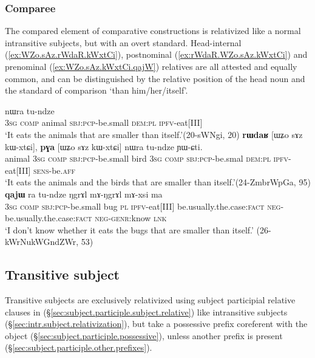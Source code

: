 \subsubsection{Comparee} \label{comparee.relativization}
The compared element of comparative constructions is relativized like a normal intransitive subjects, but with an overt standard. Head-internal (\ref{ex:WZo.sAz.rWdaR.kWxtCi}), postnominal (\ref{ex:rWdaR.WZo.sAz.kWxtCi}) and prenominal (\ref{ex:WZo.sAz.kWxtCi.qajW}) relatives are all attested and equally common, and can be distinguished by the relative position of the head noun and the standard of comparison  `than him/her/itself'.

\begin{exe}
\ex 
\begin{xlist}
\ex \label{ex:WZo.sAz.rWdaR.kWxtCi}
 nɯra tu-ndze \\
\textsc{3sg} \textsc{comp} animal \textsc{sbj}:\textsc{pcp}-be.small \textsc{dem}:\textsc{pl} \textsc{ipfv}-eat[III] \\
\glt `It eats the animals that are smaller than itself.'(20-sWNgi, 20)
\ex \label{ex:rWdaR.WZo.sAz.kWxtCi}
\gll \textbf{rɯdaʁ} [ɯʑo sɤz kɯ-xtɕi], \textbf{pɣa} [ɯʑo sɤz kɯ-xtɕi] nɯra tu-ndze ɲɯ-ɕti. \\
animal \textsc{3sg} \textsc{comp} \textsc{sbj}:\textsc{pcp}-be.small bird \textsc{3sg} \textsc{comp} \textsc{sbj}:\textsc{pcp}-be.smal \textsc{dem}:\textsc{pl} \textsc{ipfv}-eat[III] \textsc{sens}-be.\textsc{aff} \\
\glt `It eats the animals and the birds that are smaller than itself.'(24-ZmbrWpGa, 95)
\ex \label{ex:WZo.sAz.kWxtCi.qajW}
 \textbf{qajɯ} ra tu-ndze ŋgrɤl mɤ-ŋgrɤl mɤ-xsi ma \\
\textsc{3sg} \textsc{comp} \textsc{sbj}:\textsc{pcp}-be.small  bug \textsc{pl} \textsc{ipfv}-eat[III] be.usually.the.case:\textsc{fact} \textsc{neg}-be.usually.the.case:\textsc{fact} \textsc{neg}-\textsc{genr}:know \textsc{lnk} \\
\glt `I don't know whether it eats the bugs that are smaller than itself.' (26-kWrNukWGndZWr, 53)
\end{xlist}
\end{exe} 


\subsection{Transitive subject}  \label{sec:tr.subject.relativization}
Transitive subjects are exclusively relativized using subject participial relative clauses in  (§\ref{sec:subject.participle.subject.relative}) like intransitive subjects (§\ref{sec:intr.subject.relativization}), but take a possessive prefix coreferent with the object (§\ref{sec:subject.participle.possessive}), unless another prefix is present (§\ref{sec:subject.participle.other.prefixes}).

